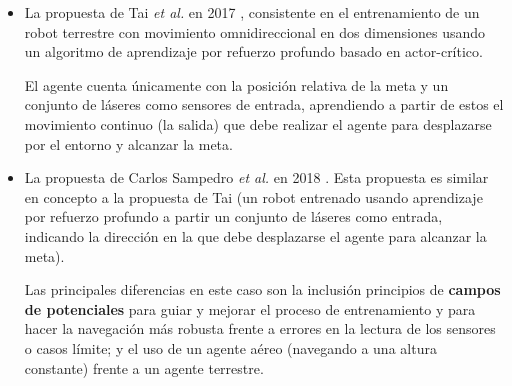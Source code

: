 \begin{itemize}
	\item La propuesta de Tai \textit{et al.} en 2017 \cite{Tai2017VirtualtorealDR}, consistente en el entrenamiento de un robot terrestre con movimiento omnidireccional en dos dimensiones usando un algoritmo de aprendizaje por refuerzo profundo basado en actor-crítico.
	
	El agente cuenta únicamente con la posición relativa de la meta y un conjunto de láseres como sensores de entrada, aprendiendo a partir de estos el movimiento continuo (la salida) que debe realizar el agente para desplazarse por el entorno y alcanzar la meta.
	\item La propuesta de Carlos Sampedro \textit{et al.} en 2018 \cite{Sampedro2018}. Esta propuesta es similar en concepto a la propuesta de Tai (un robot entrenado usando aprendizaje por refuerzo profundo a partir un conjunto de láseres como entrada, indicando la dirección en la que debe desplazarse el agente para alcanzar la meta).
	
	Las principales diferencias en este caso son la inclusión principios de \textbf{campos de potenciales} para guiar y mejorar el proceso de entrenamiento y para hacer la navegación más robusta frente a errores en la lectura de los sensores o casos límite; y el uso de un agente aéreo (navegando a una altura constante) frente a un agente terrestre.
\end{itemize}